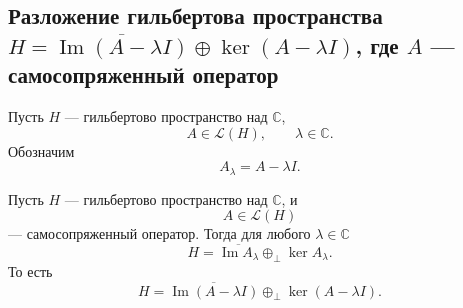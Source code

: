 \subsection{Разложение гильбертова пространства \texorpdfstring{\(H=\overline{\operatorname{Im}(A-\lambda I)}\oplus\ker(A-\lambda I)\)}{H = cl Im(A-lambda I) plus Ker(A-lambda I)}, где \texorpdfstring{\(A\)}{A} --- самосопряженный оператор}

\begin{definition}
	Пусть \(H\) --- гильбертово пространство над \(\mathbb{C}\),
	\[
	A\in\mathcal{L}(H),
	\qquad
	\lambda\in\mathbb{C}.
	\]
	Обозначим
	\[
	A_\lambda=A-\lambda I.
	\]
\end{definition}

\begin{theorem}
	Пусть \(H\) --- гильбертово пространство над \(\mathbb{C}\), и
	\[
	A\in\mathcal{L}(H)
	\]
	--- самосопряженный оператор. Тогда для любого \(\lambda\in\mathbb{C}\)
	\[
	H=\overline{\operatorname{Im}A_\lambda}\oplus_{\perp}\ker A_\lambda.
	\]
	То есть
	\[
	H
	=
	\overline{\operatorname{Im}(A-\lambda I)}
	\oplus_{\perp}
	\ker(A-\lambda I).
	\]
\end{theorem}

